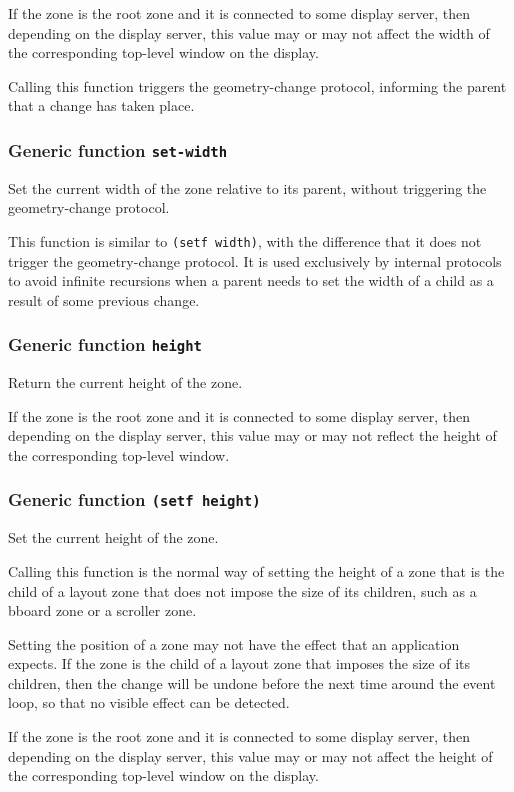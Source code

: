 \documentclass{report}
\begin{document}
If the zone is the root zone and it is connected to some display
server, then depending on the display server, this value may or
may not affect the width of the corresponding top-level window
on the display.

Calling this function triggers the geometry-change protocol,
informing the parent that a change has taken place.  

\subsubsection{Generic function \texttt{set-width}}

Set the current width of the zone relative to its parent, without
triggering the geometry-change protocol.

This function is similar to \texttt{(setf width)}, with the difference
that it does not trigger the geometry-change protocol.  It is used
exclusively by internal protocols to avoid infinite recursions when a
parent needs to set the width of a child as a result of some previous
change.

\subsubsection{Generic function \texttt{height}}

Return the current height of the zone.

If the zone is the root zone and it is connected to some display
server, then depending on the display server, this value may or
may not reflect the height of the corresponding top-level window.

\subsubsection{Generic function \texttt{(setf height)}}

Set the current height of the zone.

Calling this function is the normal way of setting the height of a
zone that is the child of a layout zone that does not impose the
size of its children, such as a bboard zone or a scroller zone.

Setting the position of a zone may not have the effect that an
application expects.  If the zone is the child of a layout zone
that imposes the size of its children, then the change will be
undone before the next time around the event loop, so that no
visible effect can be detected.

If the zone is the root zone and it is connected to some display
server, then depending on the display server, this value may or
may not affect the height of the corresponding top-level window on
the display.
\end{document}
